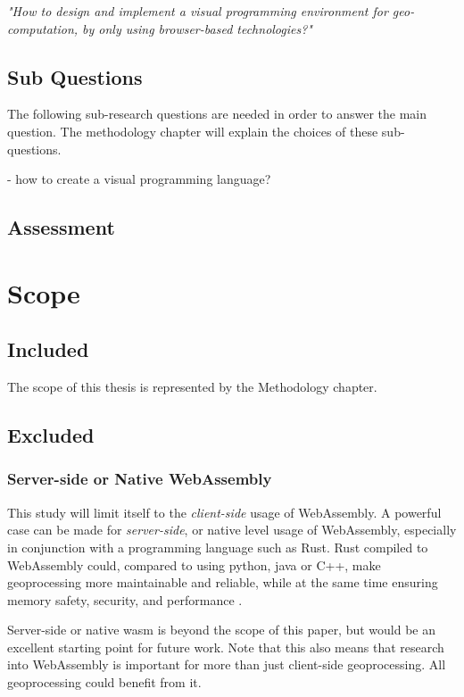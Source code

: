 \textit{"How to design and implement a visual programming environment for geo-computation, by only using browser-based technologies?"}

\subsection*{Sub Questions}

The following sub-research questions are needed in order to answer the main question. The methodology chapter will explain the choices of these sub-questions. 

- how to create a visual programming language?

\newpage
\subsection*{Assessment}

\newpage
\section{Scope}
\subsection*{Included}
The scope of this thesis is represented by the Methodology chapter. 

\subsection*{Excluded}

\subsubsection*{ Server-side or Native WebAssembly } %

This study will limit itself to the \emph{client-side} usage of WebAssembly. 
A powerful case can be made for \emph{server-side}, or native level usage of WebAssembly, especially in conjunction with a programming language such as Rust. 
Rust compiled to WebAssembly could, compared to using python, java or C++, make geoprocessing more maintainable and reliable, while at the same time ensuring memory safety, security, and performance \cite{clack_standardizing_2019}. 

Server-side or native wasm is beyond the scope of this paper, but would be an excellent starting point for future work. Note that this also means that research into WebAssembly is important for more than just client-side geoprocessing. All geoprocessing could benefit from it.



